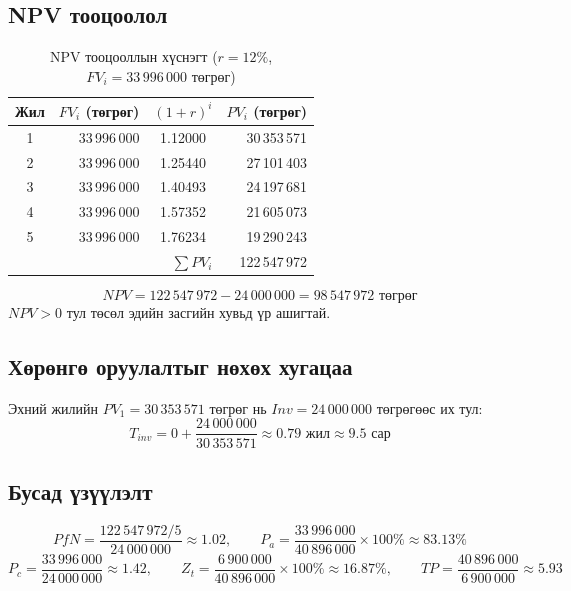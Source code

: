 \subsection{NPV тооцоолол}
\begin{table}[H]
\centering
\caption{NPV тооцооллын хүснэгт ($r = 12\%$, $FV_i = 33\,996\,000$ төгрөг)}
\label{table:npv}
\begin{tabular}{|c|r|c|r|}
\hline
\textbf{Жил} & \textbf{$FV_i$ (төгрөг)} & \textbf{$(1+r)^i$} & \textbf{$PV_i$ (төгрөг)} \\ \hline
1 & 33\,996\,000 & 1.12000 & 30\,353\,571 \\ \hline
2 & 33\,996\,000 & 1.25440 & 27\,101\,403 \\ \hline
3 & 33\,996\,000 & 1.40493 & 24\,197\,681 \\ \hline
4 & 33\,996\,000 & 1.57352 & 21\,605\,073 \\ \hline
5 & 33\,996\,000 & 1.76234 & 19\,290\,243 \\ \hline
\multicolumn{3}{|r|}{$\sum PV_i$} & 122\,547\,972 \\ \hline
\end{tabular}
\end{table}

\begin{equation}
NPV = 122\,547\,972 - 24\,000\,000 = 98\,547\,972 \text{ төгрөг}
\end{equation}
$NPV > 0$ тул төсөл эдийн засгийн хувьд үр ашигтай.

\subsection{Хөрөнгө оруулалтыг нөхөх хугацаа}
Эхний жилийн $PV_1 = 30\,353\,571$ төгрөг нь $Inv = 24\,000\,000$ төгрөгөөс их тул:
\begin{equation}
T_{inv} = 0 + \frac{24\,000\,000}{30\,353\,571} \approx 0.79 \text{ жил} \approx 9.5 \text{ сар}
\end{equation}

\subsection{Бусад үзүүлэлт}
\begin{equation}
PfN = \frac{122\,547\,972 / 5}{24\,000\,000} \approx 1.02, \qquad
P_a = \frac{33\,996\,000}{40\,896\,000}\times 100\% \approx 83.13\%
\end{equation}
\begin{equation}
P_c = \frac{33\,996\,000}{24\,000\,000} \approx 1.42, \qquad
Z_t = \frac{6\,900\,000}{40\,896\,000}\times 100\% \approx 16.87\%, \qquad
TP = \frac{40\,896\,000}{6\,900\,000} \approx 5.93
\end{equation}

